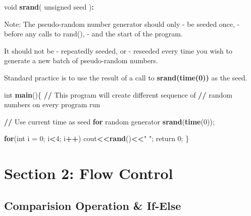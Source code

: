 \documentclass[
]{article}
\newenvironment{Shaded}{\begin{snugshade}}{\end{snugshade}}
\newcommand{\AttributeTok}[1]{\textcolor[rgb]{0.13,0.29,0.53}{#1}}
\newcommand{\ControlFlowTok}[1]{\textcolor[rgb]{0.13,0.29,0.53}{\textbf{#1}}}
\newcommand{\DecValTok}[1]{\textcolor[rgb]{0.00,0.00,0.81}{#1}}
\newcommand{\ErrorTok}[1]{\textcolor[rgb]{0.64,0.00,0.00}{\textbf{#1}}}
\newcommand{\FunctionTok}[1]{\textcolor[rgb]{0.13,0.29,0.53}{\textbf{#1}}}
\newcommand{\NormalTok}[1]{#1}
\newcommand{\SpecialCharTok}[1]{\textcolor[rgb]{0.81,0.36,0.00}{\textbf{#1}}}
\newcommand{\StringTok}[1]{\textcolor[rgb]{0.31,0.60,0.02}{#1}}
\begin{document}
\begin{Shaded}
\begin{Highlighting}[]
\NormalTok{void }\FunctionTok{srand}\NormalTok{( unsigned seed )}\SpecialCharTok{:} 
\end{Highlighting}
\end{Shaded}

Note: The pseudo-random number generator should only - be seeded once, -
before any calls to rand(), - and the start of the program.

It should not be - repeatedly seeded, or - reseeded every time you wish
to generate a new batch of pseudo-random numbers.

Standard practice is to use the result of a call to
\textbf{srand(time(0))} as the seed.

\begin{Shaded}
\begin{Highlighting}[]
\NormalTok{int }\FunctionTok{main}\NormalTok{()\{ }
    \SpecialCharTok{/}\ErrorTok{/}\NormalTok{ This program will create different sequence of  }
    \SpecialCharTok{/}\ErrorTok{/}\NormalTok{ random numbers on every program run  }
  
    \SpecialCharTok{/}\ErrorTok{/}\NormalTok{ Use current time as seed }\ControlFlowTok{for}\NormalTok{ random generator }
    \FunctionTok{srand}\NormalTok{(}\FunctionTok{time}\NormalTok{(}\DecValTok{0}\NormalTok{)); }
  
    \ControlFlowTok{for}\NormalTok{(int }\AttributeTok{i =} \DecValTok{0}\NormalTok{; i}\SpecialCharTok{\textless{}}\DecValTok{4}\NormalTok{; i}\SpecialCharTok{++}\NormalTok{) }
\NormalTok{        cout}\SpecialCharTok{\textless{}}\ErrorTok{\textless{}}\FunctionTok{rand}\NormalTok{()}\SpecialCharTok{\textless{}}\ErrorTok{\textless{}}\StringTok{" "}\NormalTok{; }
\NormalTok{    return }\DecValTok{0}\NormalTok{; }
\NormalTok{\} }
\end{Highlighting}
\end{Shaded}

\section{Section 2: Flow Control}\label{section-2-flow-control}

\subsection{Comparision Operation \&
If-Else}\label{comparision-operation-if-else}
\end{document}
